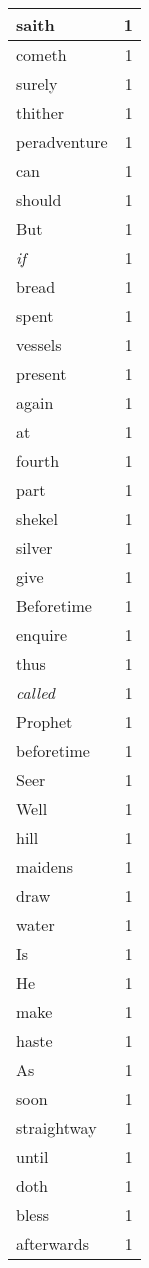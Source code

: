 \begin{center}
\begin{longtable}{l|r}
saith & 1 \\ \hline
cometh & 1 \\ \hline
surely & 1 \\ \hline
thither & 1 \\ \hline
peradventure & 1 \\ \hline
can & 1 \\ \hline
should & 1 \\ \hline
But & 1 \\ \hline
\emph{if} & 1 \\ \hline
bread & 1 \\ \hline
spent & 1 \\ \hline
vessels & 1 \\ \hline
present & 1 \\ \hline
again & 1 \\ \hline
at & 1 \\ \hline
fourth & 1 \\ \hline
part & 1 \\ \hline
shekel & 1 \\ \hline
silver & 1 \\ \hline
give & 1 \\ \hline
Beforetime & 1 \\ \hline
enquire & 1 \\ \hline
thus & 1 \\ \hline
\emph{called} & 1 \\ \hline
Prophet & 1 \\ \hline
beforetime & 1 \\ \hline
Seer & 1 \\ \hline
Well & 1 \\ \hline
hill & 1 \\ \hline
maidens & 1 \\ \hline
draw & 1 \\ \hline
water & 1 \\ \hline
Is & 1 \\ \hline
He & 1 \\ \hline
make & 1 \\ \hline
haste & 1 \\ \hline
As & 1 \\ \hline
soon & 1 \\ \hline
straightway & 1 \\ \hline
until & 1 \\ \hline
doth & 1 \\ \hline
bless & 1 \\ \hline
afterwards & 1 \\ \hline

\end{longtable}
\end{center}
